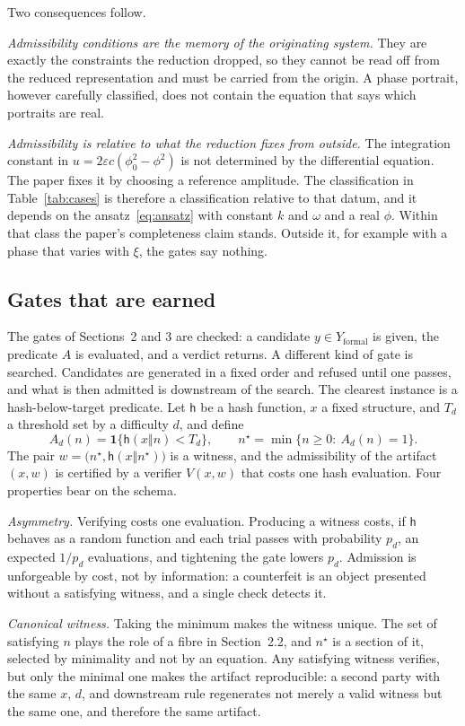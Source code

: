 \documentclass[11pt]{article}
\theoremstyle{definition}
\theoremstyle{remark}
\newcommand{\Yf}{Y_{\mathrm{formal}}}
\begin{document}
Two consequences follow.

\emph{Admissibility conditions are the memory of the originating system.} They are exactly the constraints the reduction dropped, so they cannot be read off from the reduced representation and must be carried from the origin. A phase portrait, however carefully classified, does not contain the equation that says which portraits are real.

\emph{Admissibility is relative to what the reduction fixes from outside.} The integration constant in $u=2\varepsilon c(\phi_0^2-\phi^2)$ is not determined by the differential equation. The paper fixes it by choosing a reference amplitude. The classification in Table~\ref{tab:cases} is therefore a classification relative to that datum, and it depends on the ansatz~\eqref{eq:ansatz} with constant $k$ and $\omega$ and a real $\phi$. Within that class the paper's completeness claim stands. Outside it, for example with a phase that varies with $\xi$, the gates say nothing.

\subsection{Gates that are earned}

The gates of Sections~2 and 3 are checked: a candidate $y\in\Yf$ is given, the predicate $A$ is evaluated, and a verdict returns. A different kind of gate is searched. Candidates are generated in a fixed order and refused until one passes, and what is then admitted is downstream of the search. The clearest instance is a hash-below-target predicate. Let $\mathsf h$ be a hash function, $x$ a fixed structure, and $T_d$ a threshold set by a difficulty $d$, and define
\[
  A_d(n)=\mathbf 1\{\mathsf h(x\Vert n)<T_d\},\qquad n^{\star}=\min\{n\ge0:\ A_d(n)=1\}.
\]
The pair $w=\big(n^{\star},\mathsf h(x\Vert n^{\star})\big)$ is a witness, and the admissibility of the artifact $(x,w)$ is certified by a verifier $V(x,w)$ that costs one hash evaluation. Four properties bear on the schema.

\emph{Asymmetry.} Verifying costs one evaluation. Producing a witness costs, if $\mathsf h$ behaves as a random function and each trial passes with probability $p_d$, an expected $1/p_d$ evaluations, and tightening the gate lowers $p_d$. Admission is unforgeable by cost, not by information: a counterfeit is an object presented without a satisfying witness, and a single check detects it.

\emph{Canonical witness.} Taking the minimum makes the witness unique. The set of satisfying $n$ plays the role of a fibre in Section~2.2, and $n^{\star}$ is a section of it, selected by minimality and not by an equation. Any satisfying witness verifies, but only the minimal one makes the artifact reproducible: a second party with the same $x$, $d$, and downstream rule regenerates not merely a valid witness but the same one, and therefore the same artifact.
\end{document}
